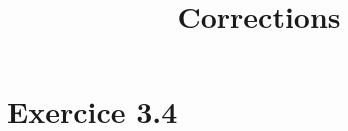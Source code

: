 \documentclass[10pt,a4paper]{article}
\title{Corrections}
\begin{document}
\maketitle
\section{Exercice 3.4}
\end{document}
